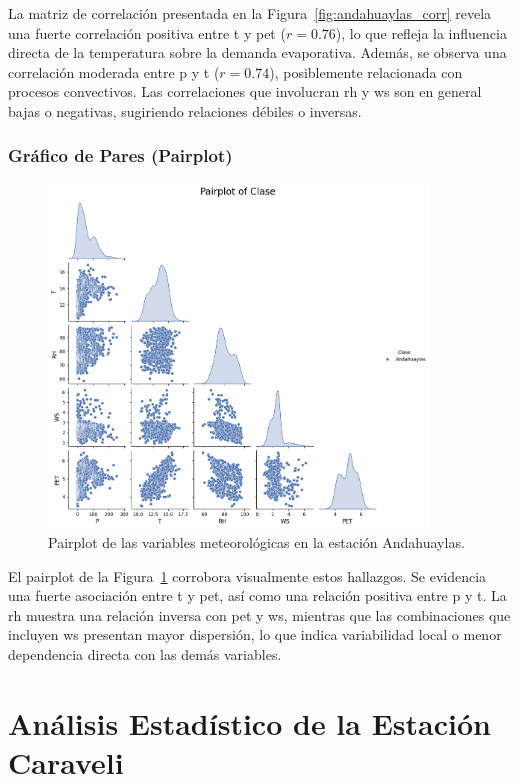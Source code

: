 La matriz de correlación presentada en la Figura~\ref{fig:andahuaylas_corr} revela una fuerte correlación positiva entre \gls{t} y \gls{pet} (\(r = 0.76\)), lo que refleja la influencia directa de la temperatura sobre la demanda evaporativa. Además, se observa una correlación moderada entre \gls{p} y \gls{t} (\(r = 0.74\)), posiblemente relacionada con procesos convectivos. Las correlaciones que involucran \gls{rh} y \gls{ws} son en general bajas o negativas, sugiriendo relaciones débiles o inversas.


\subsubsection*{Gráfico de Pares (Pairplot)}
\begin{figure}[htbp]
\centering
\includegraphics[width=0.9\textwidth]{resultados/por_estacion_meteorologica/Andahuaylas/pairplot.png}
\caption{Pairplot de las variables meteorológicas en la estación Andahuaylas.}
\label{fig:andahuaylas_pairplot}
\end{figure}
El pairplot de la Figura~\ref{fig:andahuaylas_pairplot} corrobora visualmente estos hallazgos. Se evidencia una fuerte asociación entre \gls{t} y \gls{pet}, así como una relación positiva entre \gls{p} y \gls{t}. La \gls{rh} muestra una relación inversa con \gls{pet} y \gls{ws}, mientras que las combinaciones que incluyen \gls{ws} presentan mayor dispersión, lo que indica variabilidad local o menor dependencia directa con las demás variables.


\section{Análisis Estadístico de la Estación Caraveli}

